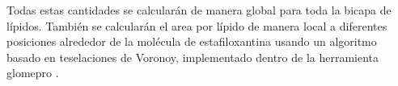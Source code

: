 Todas estas cantidades se calcular\'{a}n de manera global para toda la bicapa de l\'{i}pidos. Tambi\'{e}n se calcular\'{a}n el area por l\'{i}pido de manera local a diferentes posiciones alrededor de la mol\'{e}cula de estafiloxantina usando un algoritmo basado en teselaciones de Voronoy, implementado dentro de la herramienta glomepro \cite{Melendez-Delgado2018StudyingBilayers}.\\

















